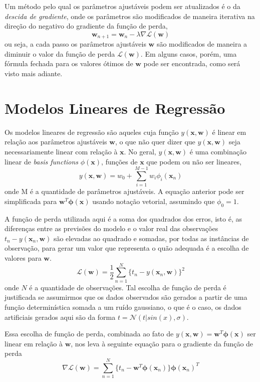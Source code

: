 \documentclass{article}
\begin{document}
Um método pelo qual os parâmetros ajustáveis podem ser atualizados é o da \emph{descida de gradiente}, onde os parâmetros
são modificados de maneira iterativa na direção do negativo do gradiente da função de perda,
\[ \textbf{w}_{n + 1} = \textbf{w}_n - \lambda \nabla \mathcal{L}(\textbf{w}) \]
ou seja, a cada passo os parâmetros ajustáveis \( \textbf{w} \) são modificados de maneira a diminuir o valor da
função de perda \( \mathcal{L}(\textbf{w}) \). Em alguns casos, porém, uma fórmula fechada para os valores ótimos de \( \textbf{w} \)
pode ser encontrada, como será visto mais adiante.

\section{Modelos Lineares de Regressão}

Os modelos lineares de regressão são aqueles cuja função \( y(\textbf{x}, \textbf{w}) \) é linear em relação aos parâmetros
ajustáveis \( \textbf{w} \), o que não quer dizer que \( y(\textbf{x}, \textbf{w}) \) seja necessariamente linear com relação
à \( \textbf{x} \). No geral, \( y(\textbf{x}, \textbf{w}) \) é uma combinação linear de \emph{basis functions}
\( \phi(\textbf{x}) \), funções de \( \textbf{x} \) que podem ou não ser lineares,
\[ y(\textbf{x}, \textbf{w}) = w_0 + \sum_{i=1}^{M-1} w_i \phi_i(\textbf{x}_n) \]
onde M é a quantidade de parâmetros ajustáveis. A equação anterior pode ser simplificada para \( \textbf{w}^T \boldsymbol{\phi}(\textbf{x}) \)
usando notação vetorial, assumindo que \( \phi_0 = 1 \).

A função de perda utilizada aqui é a soma dos quadrados dos erros, isto é, as diferenças entre as previsões do modelo e o
valor real das observações \( t_n - y(\textbf{x}_n, \textbf{w}) \) são elevadas ao quadrado e somadas, por todas as instâncias
de observação, para gerar um valor que representa o quão adequada é a escolha de valores para \(\textbf{w}\).
\[ \mathcal{L}(\textbf{w}) = \frac{1}{2} \sum_{n=1}^{N} \{ t_n - y(\textbf{x}_n, \textbf{w})\}^2 \]
onde \(N\) é a quantidade de observações. Tal escolha de função de perda é justificada se assumirmos que os dados observados
são gerados a partir de uma função determinística somada a um ruído gaussiano, o que é o caso, os dados artificiais gerados aqui
são da forma \( t = \mathcal{N}(t | sin(x), \sigma) \).

Essa escolha de função de perda, combinada ao fato de \( y(\textbf{x}, \textbf{w}) = \textbf{w}^T \boldsymbol{\phi}(\textbf{x}) \) ser linear
em relação à \( \textbf{w} \), nos leva à seguinte equação para o gradiente da função de perda
\[ \nabla \mathcal{L}(\textbf{w}) = \sum_{n=1}^{N} \{ t_n - \textbf{w}^T \boldsymbol{\phi}(\textbf{x}_n) \} \boldsymbol{\phi}(\textbf{x}_n)^T \]
\end{document}

